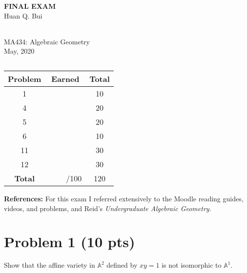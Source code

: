 \documentclass[12pt]{article}
\newcommand{\A}{\mathbb{A}}
\begin{document}
\begin{center}
	\LARGE{\textbf{FINAL EXAM}}
	\\
	\large{Huan Q. Bui}
	
	\noindent \hrulefill\\
	\small{MA434: Algebraic Geometry}\\
	\small{May, 2020}\\\vspace{-6pt}
	\hrulefill
\end{center}

 

$\,$\\
$\,$\\


\begin{center}
\begin{tabular}{|c|c|c|}
	\hline
	Problem & Earned & Total\\
	\hline
	1&&10\\
	\hline
	4&&20\\
	\hline
	5&&20\\
	\hline
	6&&10\\
	\hline
	11&&30\\
	\hline
	12&&30\\
	\hline
	\textbf{Total}&$\,\quad\quad$/100&120\\
	\hline
\end{tabular}
\end{center}



\noindent \textbf{References:} For this exam I referred extensively to the Moodle reading guides, videos, and problems, and Reid's \textit{Undergraduate Algebraic Geometry}.

\newpage



%
%
%
%




\section*{Problem 1 \small{(10 pts)}}
Show that the affine variety in $\A^2$ defined by $xy=1$ is not isomorphic to $\A^1$. \\
\end{document}
